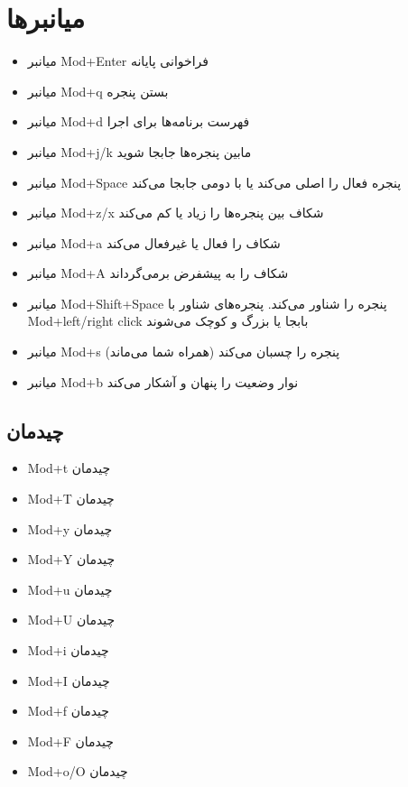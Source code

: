 \documentclass{article}
\newcommand{\s}[1]{\textenglish{Mod+#1}}
\begin{document}
\section{میانبرها}
\indent{}
\begin{itemize}
		 \item میانبر \s{Enter} فراخوانی پایانه
		 \item میانبر \s{q} بستن پنجره
		 \item میانبر \s{d} فهرست برنامه‌ها برای اجرا
		 \item میانبر \s{j/k} مابین پنجره‌ها جابجا شوید
		 \item میانبر \s{Space} پنجره فعال را اصلی می‌کند یا با دومی جابجا می‌کند
		 \item میانبر \s{z/x} شکاف بین پنجره‌ها را زیاد یا کم می‌کند
		 \item میانبر \s{a} شکاف را فعال یا غیرفعال می‌کند
		 \item میانبر \s{A} شکاف را به پیشفرض برمی‌گرداند
		 \item میانبر \s{Shift+Space} پنجره را شناور می‌کند. پنجره‌های شناور با \s{left/right click} بابجا یا بزرگ و کوچک می‌شوند
		 \item میانبر \s{s} پنجره را چسبان می‌کند (همراه شما می‌ماند)
		 \item میانبر \s{b} نوار وضعیت را پنهان و آشکار می‌کند
\end{itemize}
\subsection{چیدمان}
\begin{itemize}
	\item \s{t} چیدمان
	\item \s{T} چیدمان
	\item \s{y} چیدمان
	\item \s{Y} چیدمان
	\item \s{u} چیدمان
	\item \s{U} چیدمان
	\item \s{i} چیدمان
	\item \s{I} چیدمان
	\item \s{f} چیدمان
	\item \s{F} چیدمان
	\item \s{o/O} چیدمان
\end{itemize}
\end{document}
